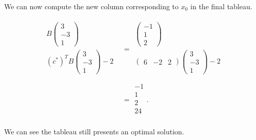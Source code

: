 \documentclass[10pt]{article}
\begin{document}
\begin{enumerate}
\begin{enumerate}
\begin{enumerate}[(i)]
          We can now compute the new column corresponding to $x_0$ in the final tableau.

          \begin{align*}
          \begin{array}{c}
            B \left(\begin{smallmatrix} 3 \\ -3 \\ 1 \end{smallmatrix}\right)\\
            \hline
            (c^*)^TB\left(\begin{smallmatrix} 3 \\ -3 \\ 1 \end{smallmatrix}\right)-2\\
          \end{array}
            &=
          \begin{array}{c}
            \left(\begin{smallmatrix} -1 \\ 1 \\ 2 \end{smallmatrix}\right)\\
            \hline
            \left(\begin{smallmatrix} 6 & -2 & 2 \end{smallmatrix}\right) \left(\begin{smallmatrix} 3 \\ -3 \\ 1 \end{smallmatrix}\right)-2\\
          \end{array} \\
            &=
          \begin{array}{r}
            -1  \\
            1 \\
            2  \\
            \hline
            24 \\
          \end{array}.
          \end{align*}

          We can see the tableau still presents an optimal solution.


\end{enumerate}
\end{enumerate}
\end{enumerate}
\end{document}
